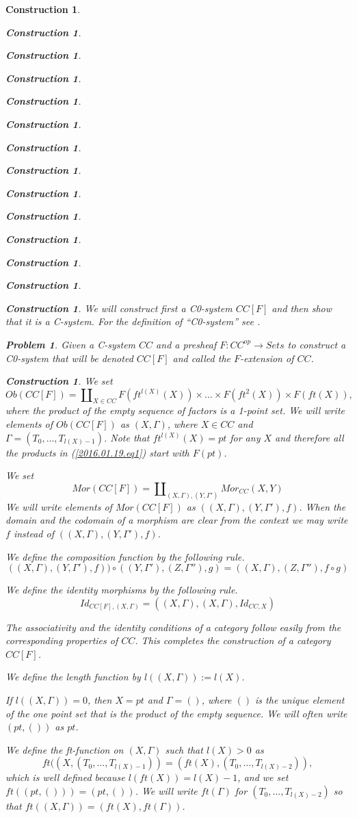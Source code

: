 \documentclass[12pt]{amsart}
\numberwithin{proposition}{subsection}
\newtheorem{problem}[proposition]{Problem}
\newtheorem{construction}[proposition]{Construction}
\newcommand{\llabel}[1]{\label{#1}}
\newcommand{\sr}{\rightarrow}
\begin{document}
\begin{construction}
\begin{construction}
\begin{construction}
\begin{construction}
\begin{construction}
\begin{construction}
\begin{construction}
\begin{construction}
\begin{construction}
\begin{construction}
\begin{construction}
\begin{construction}
\begin{construction}
\begin{construction}
We will construct first a C0-system $CC[F]$ and then show that it is a
C-system. For the definition of ``C0-system'' see \cite[Definition
  2.1]{Csubsystems}.
%
\begin{problem}\llabel{2016.01.19.prob1}
Given a C-system $CC$ and a presheaf $F:CC^{op}\sr Sets$ to construct a
C0-system that will be denoted $CC[F]$ and called the {\em $F$-extension of $CC$}.
\end{problem}
%
\begin{construction}\rm\llabel{2016.01.19.constr1}
We set 
%
\begin{equation}\llabel{2016.01.19.eq1}
Ob(CC[F])=\amalg_{X\in CC} F(ft^{l(X)}(X))\times\dots\times F(ft^2(X))\times
F(ft(X)),
\end{equation}%
%
where the product of the empty sequence of factors is a 1-point set. We will
write elements of $Ob(CC[F])$ as $(X,\Gamma)$, where $X\in CC$ and
$\Gamma=(T_0,\dots,T_{l(X)-1})$. Note that $ft^{l(X)}(X)=pt$ for any $X$ and
therefore all the products in (\ref{2016.01.19.eq1}) start with $F(pt)$.

We set
%
$$Mor(CC[F])=\amalg_{(X,\Gamma),(Y,\Gamma')}Mor_{CC}(X,Y)$$
%
We will write elements of $Mor(CC[F])$ as $((X,\Gamma),(Y,\Gamma'),f)$. When
the domain and the codomain of a morphism are clear from the context we may
write $f$ instead of $((X,\Gamma),(Y,\Gamma'),f)$.

We define the composition function by the following rule.
%
$$((X,\Gamma),(Y,\Gamma'),f))\circ ((Y,\Gamma'),(Z,\Gamma''),g)=((X,\Gamma),(Z,\Gamma''),f\circ g)$$

We define the identity morphisms by the following rule.
%
$$Id_{CC[F],(X,\Gamma)}=((X,\Gamma),(X,\Gamma),Id_{CC,X})$$
%

The associativity and the identity conditions of a category follow easily from
the corresponding properties of $CC$. This completes the construction of a
category $CC[F]$.

We define the length function by $l((X,\Gamma)):=l(X)$.

If $l((X,\Gamma))=0$, then $X=pt$ and $\Gamma=()$, where $()$ is the unique
element of the one point set that is the product of the empty sequence. We will
often write $(pt,())$ as $pt$.

We define the ft-function on $(X,\Gamma)$ such that $l(X)>0$ as 
%
$$ft((X,(T_0,\dots,T_{l(X)-1}))=(ft(X),(T_0,\dots,T_{l(X)-2})),$$
%
which is well defined because $l(ft(X))=l(X)-1$, and we set
$ft((pt,()))=(pt,())$. We will write $ft(\Gamma)$ for $(T_0,\dots,T_{l(X)-2})$
so that $ft((X,\Gamma))=(ft(X),ft(\Gamma))$.


\end{construction}
\end{construction}
\end{construction}
\end{construction}
\end{construction}
\end{construction}
\end{construction}
\end{construction}
\end{construction}
\end{construction}
\end{construction}
\end{construction}
\end{construction}
\end{construction}
\end{construction}
\end{document}
